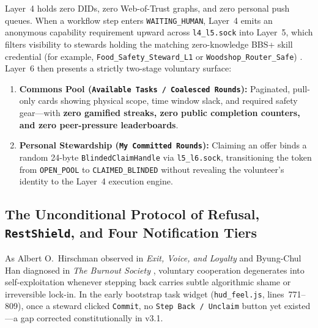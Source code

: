 Layer~4 holds zero DIDs, zero Web-of-Trust graphs, and zero personal push queues. When a workflow step enters \texttt{WAITING\_HUMAN}, Layer~4 emits an anonymous capability requirement upward across \texttt{l4\_l5.sock} into Layer~5, which filters visibility to stewards holding the matching zero-knowledge BBS+ skill credential (for example, \texttt{Food\_Safety\_Steward\_L1} or \texttt{Woodshop\_Router\_Safe}) \parencite{camenisch2004signature}. Layer~6 then presents a strictly two-stage voluntary surface:
\begin{enumerate}
    \item \textbf{Commons Pool (\texttt{Available Tasks / Coalesced Rounds}):} Paginated, pull-only cards showing physical scope, time window slack, and required safety gear---with \textbf{zero gamified streaks, zero public completion counters, and zero peer-pressure leaderboards}.
    \item \textbf{Personal Stewardship (\texttt{My Committed Rounds}):} Claiming an offer binds a random 24-byte \texttt{BlindedClaimHandle} via \texttt{l5\_l6.sock}, transitioning the token from \texttt{OPEN\_POOL} to \texttt{CLAIMED\_BLINDED} without revealing the volunteer's identity to the Layer~4 execution engine.
\end{enumerate}

\subsection{The Unconditional Protocol of Refusal, \texttt{RestShield}, and Four Notification Tiers}

As Albert O.\ Hirschman observed in \textit{Exit, Voice, and Loyalty} \parencite{hirschman1970} and Byung-Chul Han diagnosed in \textit{The Burnout Society} \parencite{han2015}, voluntary cooperation degenerates into self-exploitation whenever stepping back carries subtle algorithmic shame or irreversible lock-in. In the early bootstrap task widget (\texttt{hud\_feel.js}, lines~771--809), once a steward clicked \texttt{Commit}, no \texttt{Step Back / Unclaim} button yet existed---a gap corrected constitutionally in v3.1.

